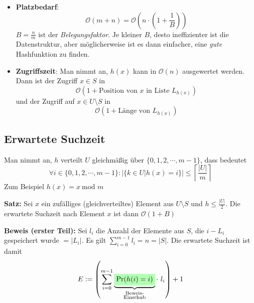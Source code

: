 \documentclass{scrartcl}%
\begin{document}
    \begin{itemize}
        \item \textsf{\textbf{Platzbedarf}}:
        \begin{equation*}
            \mathcal{O}(m+n) =  \mathcal{O}\left(n \cdot \left(1+\frac{1}{B}\right)\right)
        \end{equation*}
        $B=\frac{n}{m}$ ist der \textit{Belegungsfaktor}.
        Je kleiner $B$, desto ineffizienter ist die Datenstruktur, aber möglicherweise ist es dann einfacher, eine \textit{gute} Hashfunktion zu finden.
        \item \textsf{\textbf{Zugriffszeit}}: Man nimmt an, $h(x)$ kann in $\mathcal{O}(n)$ ausgewertet werden.
        Dann ist der Zugriff $x \in S$ in
        \begin{equation*}
            \mathcal{O}(1 + \text{Position von $x$ in Liste } L_{h(x)})
        \end{equation*}
        und der Zugriff auf $x \in U\setminus S$ in
        \begin{equation*}
            \mathcal{O}(1 + \text{Länge von } L_{h(x)})
        \end{equation*}
    \end{itemize}

    \newpage
    \subsection*{Erwartete Suchzeit}\label{subsec:erwarteteSuchzeit}
    Man nimmt an, $h$ verteilt $U$ gleichmäßig über $\{0,1,2,\cdots,m-1 \}$, dass bedeutet
    \begin{equation*}
        \forall i \in \{0,1,2,\cdots,m-1 \}: | \{k \in U | h(x)=i\} | \leq \left\lceil\frac{|U|}{m}\right\rceil
    \end{equation*}
    Zum Beispiel $h(x)=x\ \text{mod } m$

    \vspace*{0.3cm}
    \textbf{\textsf{Satz:}} Sei $x$ ein zufälliges (gleichverteiltes) Element aus $U\setminus S$ und $h \leq \frac{|U|}{2}$.
    Die erwartete Suchzeit nach Element $x$ ist dann $\mathcal{O}(1+B)$

    \vspace*{0.3cm}
    \textbf{\textsf{Beweis (erster Teil):}} Sei $l_i$ die Anzahl der Elemente aus $S$, die $i-L_i$ gespeichert wurde $=|L_i|$.
    Es gilt $\sum_{i=0}^{m-1}l_i=n=|S|$.
    Die erwartete Suchzeit ist damit
    \begin{equation*}
        E:=\left(\sum_{i=0}^{m-1}\underbrace{\colorbox{green!30}{$\text{Pr}(h(i)=i)$}}_{\substack{\text{Beweis-} \\ \text{Einschub}}} \cdot\ l_i\right) + 1
    \end{equation*}
\end{document}
